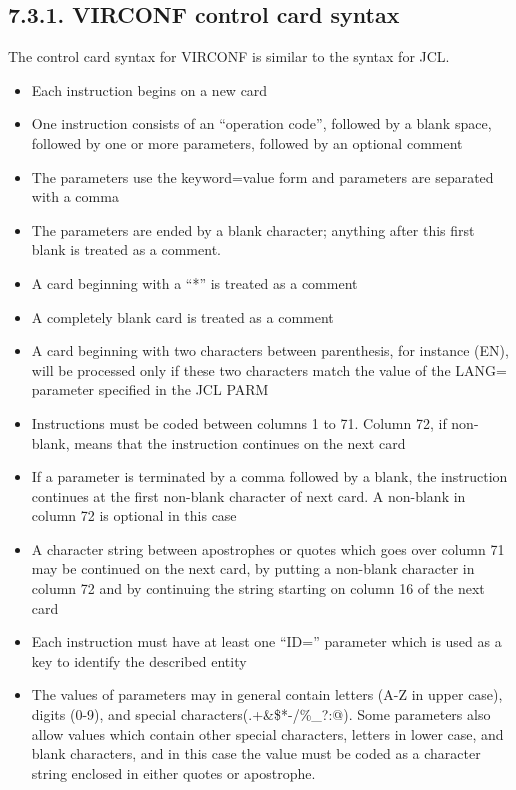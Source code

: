 \documentclass[letterpaper,10pt,english]{sphinxmanual}
\begin{document}
\subsection{7.3.1. VIRCONF control card syntax}
\label{\detokenize{Installation_Guide:virconf-control-card-syntax}}
The control card syntax for VIRCONF is similar to the syntax for JCL.
\begin{itemize}
\item {} 
Each instruction begins on a new card

\item {} 
One instruction consists of an “operation code”, followed by a blank space, followed by one or more parameters, followed by an optional comment

\item {} 
The parameters use the keyword=value form and parameters are separated with a comma

\item {} 
The parameters are ended by a blank character; anything after this first blank is treated as a comment.

\item {} 
A card beginning with a “*” is treated as a comment

\item {} 
A completely blank card is treated as a comment

\item {} 
A card beginning with two characters between parenthesis, for instance (EN), will be processed only if these two characters match the value of the LANG= parameter specified in the JCL PARM

\item {} 
Instructions must be coded between columns 1 to 71. Column 72, if non-blank, means that the instruction continues on the next card

\item {} 
If a parameter is terminated by a comma followed by a blank, the instruction continues at the first non-blank character of next card. A non-blank in column 72 is optional in this case

\item {} 
A character string between apostrophes or quotes which goes over column 71 may be continued on the next card, by putting a non-blank character in column 72 and by continuing the string starting on column 16 of the next card

\item {} 
Each instruction must have at least one “ID=” parameter which is used as a key to identify the described entity

\item {} 
The values of parameters may in general contain letters (A-Z in upper case), digits (0-9), and special characters(.+\&\$*-/\%\_?:@). Some parameters also allow values which contain other special characters, letters in lower case, and blank characters, and in this case the value must be coded as a character string enclosed in either quotes or apostrophe.

\end{itemize}
\end{document}
